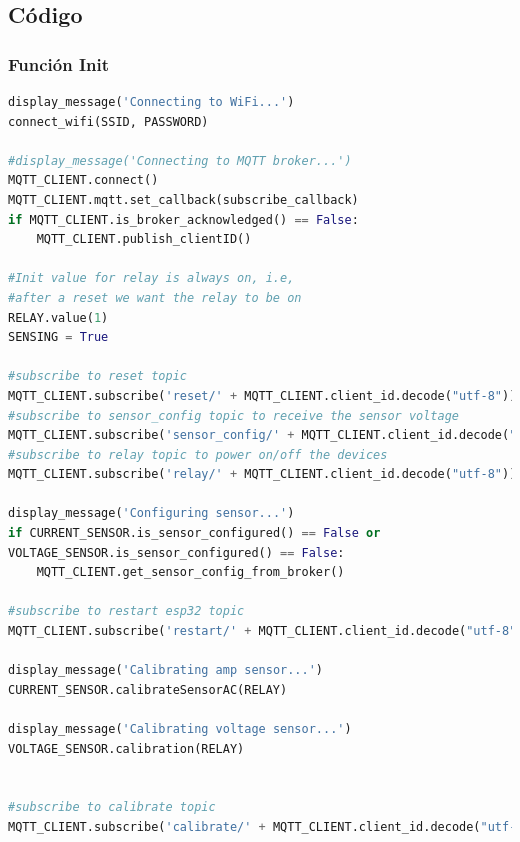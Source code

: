 \begin{titlepage}
\subsection{Código}
\subsubsection{Función Init}
\begin{lstlisting}[language=python]
display_message('Connecting to WiFi...')
connect_wifi(SSID, PASSWORD)

#display_message('Connecting to MQTT broker...')
MQTT_CLIENT.connect()
MQTT_CLIENT.mqtt.set_callback(subscribe_callback)
if MQTT_CLIENT.is_broker_acknowledged() == False:
	MQTT_CLIENT.publish_clientID()

#Init value for relay is always on, i.e, 
#after a reset we want the relay to be on
RELAY.value(1)
SENSING = True

#subscribe to reset topic
MQTT_CLIENT.subscribe('reset/' + MQTT_CLIENT.client_id.decode("utf-8"))
#subscribe to sensor_config topic to receive the sensor voltage
MQTT_CLIENT.subscribe('sensor_config/' + MQTT_CLIENT.client_id.decode("utf-8"))
#subscribe to relay topic to power on/off the devices
MQTT_CLIENT.subscribe('relay/' + MQTT_CLIENT.client_id.decode("utf-8"))

display_message('Configuring sensor...')
if CURRENT_SENSOR.is_sensor_configured() == False or 
VOLTAGE_SENSOR.is_sensor_configured() == False:
	MQTT_CLIENT.get_sensor_config_from_broker()

#subscribe to restart esp32 topic
MQTT_CLIENT.subscribe('restart/' + MQTT_CLIENT.client_id.decode("utf-8"))

display_message('Calibrating amp sensor...')
CURRENT_SENSOR.calibrateSensorAC(RELAY)

display_message('Calibrating voltage sensor...')
VOLTAGE_SENSOR.calibration(RELAY)


#subscribe to calibrate topic
MQTT_CLIENT.subscribe('calibrate/' + MQTT_CLIENT.client_id.decode("utf-8"))
\end{lstlisting}


\end{titlepage}
